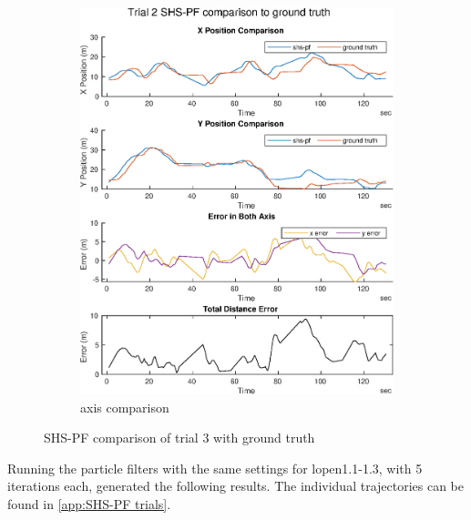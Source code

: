 \begin{figure}[H]
\begin{subfigure}[t]{.45\textwidth}
		\includegraphics[width=\linewidth]{images/20201107_1338_trial2_Total_Distance_Error}
		\caption{axis comparison}
		\label{fig:shspf_trial2_comparison}
	\end{subfigure}
	\caption{SHS-PF comparison of trial 3 with ground truth}
	\label{fig:shspf_trial2_shs_gt_comparison}
\end{figure}

Running the particle filters with the same settings for lopen1.1-1.3, with 5 iterations each, generated the following results. The individual trajectories can be found in \cref{app:SHS-PF trials}.

